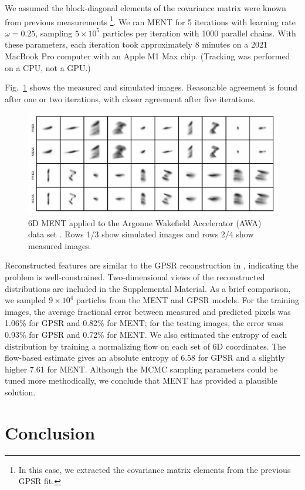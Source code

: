 \documentclass[%
    reprint,
    twocolumn,
    amsmath,
    amssymb,
    aps,
    prstab,
]{revtex4-2}
\begin{document}
We assumed the block-diagonal elements of the covariance matrix were known from previous measurements \footnote{In this case, we extracted the covariance matrix elements from the previous GPSR fit.}. We ran MENT for 5 iterations with learning rate $\omega = 0.25$, sampling $5 \times 10^5$ particles per iteration with 1000 parallel chains. With these parameters, each iteration took approximately 8 minutes on a 2021 MacBook Pro computer with an Apple M1 Max chip. (Tracking was performed on a CPU, not a GPU.)

Fig.~\ref{fig:awa-proj} shows the measured and simulated images. Reasonable agreement is found after one or two iterations, with closer agreement after five iterations.
%
\begin{figure}
    \centering
    \includegraphics[width=\linewidth]{fig_awa_proj_05.pdf}
    \caption{6D MENT applied to the Argonne Wakefield Accelerator (AWA) data set \cite{Roussel_2024_6d}. Rows 1/3 show simulated images and rows 2/4 show measured images.}
    \label{fig:awa-proj}
\end{figure}
%
Reconstructed features are similar to the GPSR reconstruction in \cite{Roussel_2024_6d}, indicating the problem is well-constrained. Two-dimensional views of the reconstructed distributions are included in the Supplemental Material. As a brief comparison, we sampled $9 \times 10^4$ particles from the MENT and GPSR models. For the training images, the average fractional error between measured and predicted pixels was 1.06\% for GPSR and 0.82\% for MENT; for the testing images, the error wass 0.93\% for GPSR and 0.72\% for MENT. We also estimated the entropy of each distribution by training a normalizing flow \cite{Durkan_2019} on each set of 6D coordinates. The flow-based estimate gives an absolute entropy of 6.58 for GPSR and a slightly higher 7.61 for MENT. Although the MCMC sampling parameters could be tuned more methodically, we conclude that MENT has provided a plausible solution.


\section{Conclusion}\label{sec:conclusion}
\end{document}
